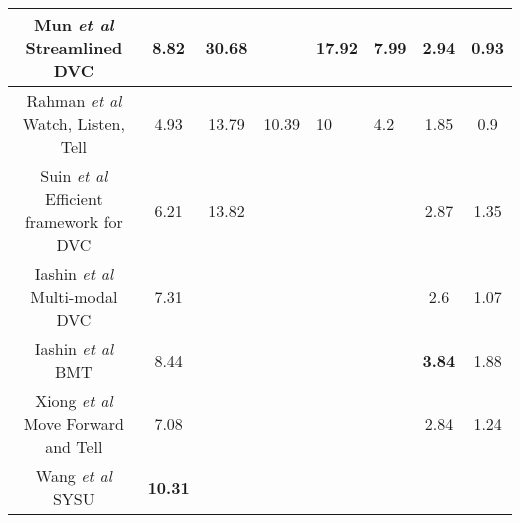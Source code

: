 \begin{table}[]
\begin{tabular}{|c|cclllcc|}
		{Mun \textit{et al} \cite{mun2019streamlined} Streamlined DVC}               & \multicolumn{1}{c|}{8.82}          & \multicolumn{1}{c|}{30.68}          & \multicolumn{1}{l|}{}                & \multicolumn{1}{l|}{17.92}           & \multicolumn{1}{l|}{7.99}          & \multicolumn{1}{c|}{2.94}          & 0.93                               \\ \hline
		Rahman \textit{et al} \cite{rahman2019watch} Watch, Listen, Tell       & \multicolumn{1}{c|}{4.93}          & \multicolumn{1}{c|}{13.79}          & \multicolumn{1}{l|}{10.39}           & \multicolumn{1}{l|}{10}              & \multicolumn{1}{l|}{4.2}           & \multicolumn{1}{c|}{1.85}          & 0.9                                \\ \hline
		Suin \textit{et al} \cite{suin2020efficient} Efficient framework for DVC & \multicolumn{1}{c|}{6.21}          & \multicolumn{1}{c|}{13.82}          & \multicolumn{1}{l|}{}                & \multicolumn{1}{l|}{}                & \multicolumn{1}{l|}{}              & \multicolumn{1}{c|}{2.87}          & 1.35                               \\ \hline
		Iashin \textit{et al} \cite{iashin2020multimodal} Multi-modal DVC            & \multicolumn{1}{c|}{7.31}          & \multicolumn{1}{l|}{}               & \multicolumn{1}{l|}{}                & \multicolumn{1}{l|}{}                & \multicolumn{1}{l|}{}              & \multicolumn{1}{c|}{2.6}           & 1.07                               \\ \hline
		Iashin \textit{et al} \cite{iashin2020better} BMT                       & \multicolumn{1}{c|}{8.44}          & \multicolumn{1}{l|}{}               & \multicolumn{1}{l|}{}                & \multicolumn{1}{l|}{}                & \multicolumn{1}{l|}{}              & \multicolumn{1}{c|}{\textbf{3.84}}          & 1.88                               \\ \hline
		Xiong \textit{et al} \cite{xiong2018forward} Move Forward and Tell      & \multicolumn{1}{c|}{7.08}          & \multicolumn{1}{l|}{}               & \multicolumn{1}{l|}{}                & \multicolumn{1}{l|}{}                & \multicolumn{1}{l|}{}              & \multicolumn{1}{c|}{2.84}          & 1.24                               \\ \hline
		{Wang \textit{et al} \cite{wang2020densecaptioning} SYSU}                        & \multicolumn{1}{c|}{\textbf{10.31}}         & \multicolumn{1}{l|}{}               & \multicolumn{1}{l|}{}                & \multicolumn{1}{l|}{}                & \multicolumn{1}{l|}{}              & \multicolumn{1}{c|}{}              &                                    \\ \hline

\end{tabular}
\end{table}
